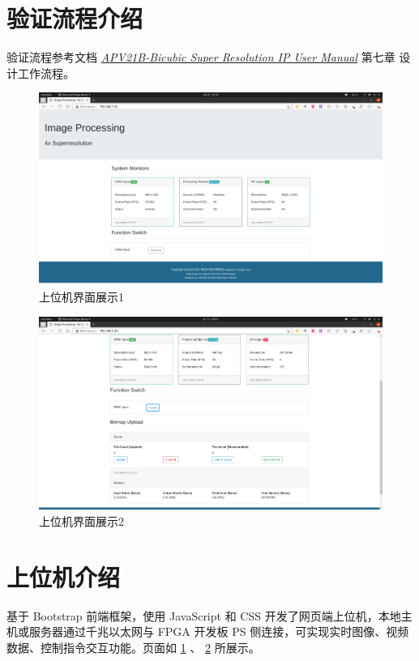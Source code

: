 \documentclass[12pt, a4paper, oneside]{ctexbook}
\begin{document}
    \section{验证流程介绍}
    验证流程参考文档 \href{../../00 IP User Manual (All Specs)/APV21B_Bicubic_Super_Resolution_IP_UM.pdf}{\textit{APV21B-Bicubic Super Resolution IP User Manual}} 第七章 设计工作流程。
    \begin{figure}[t]
        \centering
        \includegraphics[scale=0.5]{pic/web0.png}
        \caption{上位机界面展示1}
        \label{web0}
    \end{figure}
	\begin{figure}[t]
	\centering
	\includegraphics[scale=0.5]{pic/web1.png}
	\caption{上位机界面展示2}
	\label{web1}
	\end{figure}
    \section{上位机介绍}
    基于 Bootstrap 前端框架，使用 JavaScript 和 CSS 开发了网页端上位机，本地主机或服务器通过千兆以太网与 FPGA 开发板 PS 侧连接，可实现实时图像、视频数据、控制指令交互功能。页面如 \ref{web0} 、 \ref{web1} 所展示。
    
\end{document}
